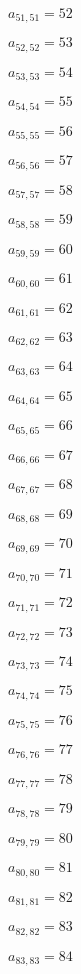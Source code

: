 \documentclass[a4paper,12pt]{article}
\begin{document}
$a _{ 51, 51 } = 52$

$a _{ 52, 52 } = 53$

$a _{ 53, 53 } = 54$

$a _{ 54, 54 } = 55$

$a _{ 55, 55 } = 56$

$a _{ 56, 56 } = 57$

$a _{ 57, 57 } = 58$

$a _{ 58, 58 } = 59$

$a _{ 59, 59 } = 60$

$a _{ 60, 60 } = 61$

$a _{ 61, 61 } = 62$

$a _{ 62, 62 } = 63$

$a _{ 63, 63 } = 64$

$a _{ 64, 64 } = 65$

$a _{ 65, 65 } = 66$

$a _{ 66, 66 } = 67$

$a _{ 67, 67 } = 68$

$a _{ 68, 68 } = 69$

$a _{ 69, 69 } = 70$

$a _{ 70, 70 } = 71$

$a _{ 71, 71 } = 72$

$a _{ 72, 72 } = 73$

$a _{ 73, 73 } = 74$

$a _{ 74, 74 } = 75$

$a _{ 75, 75 } = 76$

$a _{ 76, 76 } = 77$

$a _{ 77, 77 } = 78$

$a _{ 78, 78 } = 79$

$a _{ 79, 79 } = 80$

$a _{ 80, 80 } = 81$

$a _{ 81, 81 } = 82$

$a _{ 82, 82 } = 83$

$a _{ 83, 83 } = 84$
\end{document}
